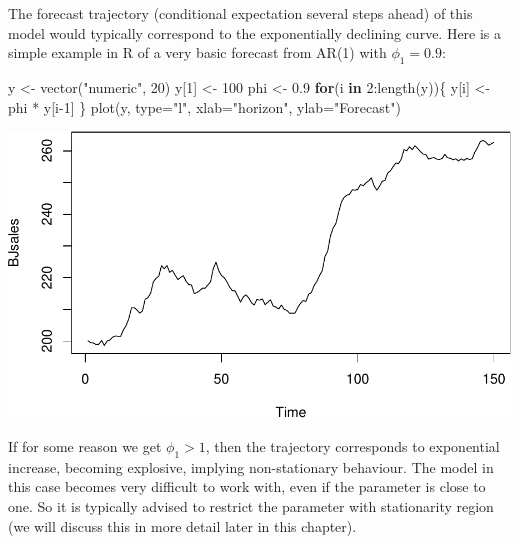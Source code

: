 \documentclass[
]{book}
\newenvironment{Shaded}{\begin{snugshade}}{\end{snugshade}}
\newcommand{\AttributeTok}[1]{\textcolor[rgb]{0.77,0.63,0.00}{#1}}
\newcommand{\ControlFlowTok}[1]{\textcolor[rgb]{0.13,0.29,0.53}{\textbf{#1}}}
\newcommand{\DecValTok}[1]{\textcolor[rgb]{0.00,0.00,0.81}{#1}}
\newcommand{\FloatTok}[1]{\textcolor[rgb]{0.00,0.00,0.81}{#1}}
\newcommand{\FunctionTok}[1]{\textcolor[rgb]{0.00,0.00,0.00}{#1}}
\newcommand{\NormalTok}[1]{#1}
\newcommand{\OtherTok}[1]{\textcolor[rgb]{0.56,0.35,0.01}{#1}}
\newcommand{\SpecialCharTok}[1]{\textcolor[rgb]{0.00,0.00,0.00}{#1}}
\newcommand{\StringTok}[1]{\textcolor[rgb]{0.31,0.60,0.02}{#1}}
\theoremstyle{definition}
\theoremstyle{definition}
\theoremstyle{definition}
\theoremstyle{definition}
\theoremstyle{remark}
\begin{document}
The forecast trajectory (conditional expectation several steps ahead) of this model would typically correspond to the exponentially declining curve. Here is a simple example in R of a very basic forecast from AR(1) with \(\phi_1=0.9\):

\begin{Shaded}
\begin{Highlighting}[]
\NormalTok{y }\OtherTok{\textless{}{-}} \FunctionTok{vector}\NormalTok{(}\StringTok{"numeric"}\NormalTok{, }\DecValTok{20}\NormalTok{)}
\NormalTok{y[}\DecValTok{1}\NormalTok{] }\OtherTok{\textless{}{-}} \DecValTok{100}
\NormalTok{phi }\OtherTok{\textless{}{-}} \FloatTok{0.9}
\ControlFlowTok{for}\NormalTok{(i }\ControlFlowTok{in} \DecValTok{2}\SpecialCharTok{:}\FunctionTok{length}\NormalTok{(y))\{}
\NormalTok{    y[i] }\OtherTok{\textless{}{-}}\NormalTok{ phi }\SpecialCharTok{*}\NormalTok{ y[i}\DecValTok{{-}1}\NormalTok{]}
\NormalTok{\}}
\FunctionTok{plot}\NormalTok{(y, }\AttributeTok{type=}\StringTok{"l"}\NormalTok{, }\AttributeTok{xlab=}\StringTok{"horizon"}\NormalTok{, }\AttributeTok{ylab=}\StringTok{"Forecast"}\NormalTok{)}
\end{Highlighting}
\end{Shaded}

\includegraphics{adam_files/figure-latex/unnamed-chunk-52-1.pdf}

If for some reason we get \(\phi_1>1\), then the trajectory corresponds to exponential increase, becoming explosive, implying non-stationary behaviour. The model in this case becomes very difficult to work with, even if the parameter is close to one. So it is typically advised to restrict the parameter with stationarity region (we will discuss this in more detail later in this chapter).
\end{document}
